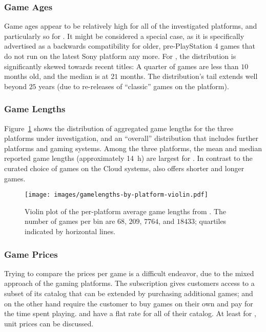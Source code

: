 \subsubsection{Game Ages}

Game ages appear to be relatively high for all of the investigated
platforms, and particularly so for \psnow. It might be considered a
special case, as it is specifically advertised as a backwards
compatibility for older, pre-PlayStation 4 games that do not run on the
latest Sony platform any more. For \steam, the distribution is
significantly skewed towards recent titles: A quarter of games are less
than $10$ months old, and the median is at $21$ months. The
distribution's tail extends well beyond $25$ years (due to re-releases
of ``classic'' games on the platform).


\subsubsection{Game Lengths}
Figure~\ref{fig:gamelengths-violin} shows the distribution of aggregated
game lengths for the three platforms under investigation, and an
``overall'' distribution that includes further platforms and gaming
systems. Among the three platforms, the mean and median reported game
lengths (approximately \SI{14}{\hour}) are largest for \gfnow. In
contrast to the curated choice of games on the Cloud systems, \steam
also offers shorter and longer games.


\begin{figure}[!t]
	\centering
	\texttt{[image: images/gamelengths-by-platform-violin.pdf]}
	\caption{Violin plot of the per-platform average game lengths from \hltb. The number of games per bin are $68$, $209$, $7764$, and $18433$; quartiles indicated by horizontal lines.}
\label{fig:gamelengths-violin}
\end{figure}



\subsubsection{Game Prices}

Trying to compare the prices per game is a difficult endeavor, due to
the mixed approach of the gaming platforms. The \gfnow subscription
gives customers access to a subset of its catalog that can be
extended by purchasing additional games; \gfnowpc and \liquid
on the other hand require the customer to buy games on their
own and pay for the
time spent playing.
\psnow and \psnowpc have a flat rate for all of their catalog.
At least for \steam, unit prices can be discussed.

